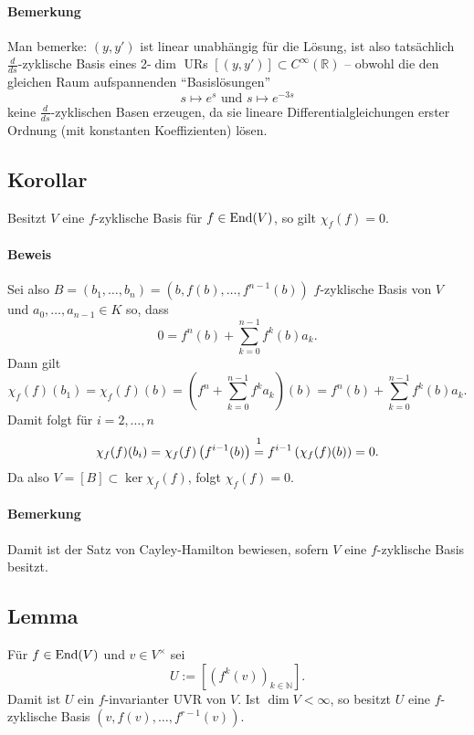 \paragraph{Bemerkung}
	Man bemerke: $ (y,y') $ ist linear unabhängig für die Lösung, ist also tatsächlich $ \frac{d}{ds} $-zyklische Basis eines 2-$ \dim $ URs $ [(y,y')]\subset C^\infty(\mathbb{R}) $ -- obwohl die den gleichen Raum aufspannenden "`Basislösungen"'
		\[ s\mapsto e^s \text{ und } s\mapsto e^{-3s} \]
	keine $ \frac{d}{ds} $-zyklischen Basen erzeugen, da sie lineare Differentialgleichungen erster Ordnung (mit konstanten Koeffizienten) lösen.
	
\subsection{Korollar}
\begin{Korollar}
	Besitzt $ V $ eine $ f $-zyklische Basis für $ f\in\operatorname{End}(V) $, so gilt $ \chi_f(f)=0 $.
\end{Korollar}
\paragraph{Beweis}
	Sei also $ B=(b_1,\dots,b_n) =(b,f(b),\dots,f^{n-1}(b)) $ $ f $-zyklische Basis von $ V $ und $ a_0,\dots,a_{n-1}\in K $ so, dass
		\[ 0 = f^n(b)+\sum_{k=0}^{n-1}f^k(b)a_k. \]
	Dann gilt
		\[ \chi_f(f)(b_1) = \chi_f(f)(b) = \left(f^n+\sum_{k=0}^{n-1}f^ka_k\right)(b) = f^n(b)+\sum_{k=0}^{n-1}f^k(b)a_k. \]
	Damit folgt für $ i=2,\dots,n $
		\[ \chi_f(f)(b_i) = \chi_f(f)\left(f^{i-1}(b)\right) \overset{\footnotemark}{=} f^{i-1}\left(\chi_f(f)(b) \right) = 0. \]
	Da also $ V=[B] \subset \ker {\chi_f(f)}$, folgt $ \chi_f(f) = 0. $
\paragraph{Bemerkung}
	Damit ist der Satz von Cayley-Hamilton bewiesen, sofern $ V $ eine $ f $-zyklische Basis besitzt.
	
\subsection{Lemma}
\begin{Lemma}
	Für $ f\in\operatorname{End}(V) $ und $ v\in V^\times  $ sei
		\[ U := \left[\left(f^k(v)\right)_{k\in{\mathbb{N}}}\right]. \]
	Damit ist $ U $ ein $ f $-invarianter UVR von $ V $. Ist $ \dim V < \infty $, so besitzt $ U $ eine $ f $-zyklische Basis $ \left(v,f(v),\dots,f^{r-1}(v)\right) $.
\end{Lemma}
